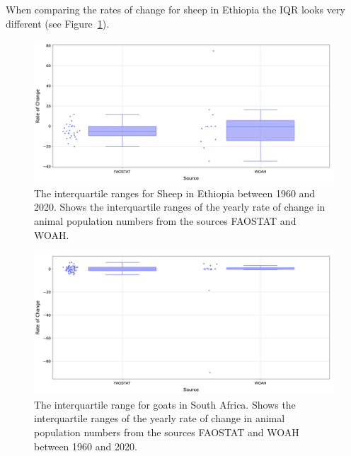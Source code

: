 \documentclass{article}
\begin{document}
When comparing the rates of change for sheep in Ethiopia the IQR looks very different (see Figure~\ref{fig:image7}).
\begin{figure}[h!]
    \centering
    \includegraphics[width=1\textwidth]{image7}
    \caption{The interquartile ranges for Sheep in Ethiopia between 1960 and 2020. Shows the interquartile ranges of the yearly rate of change in animal population numbers from the sources FAOSTAT and WOAH.}
    \label{fig:image7}
\end{figure}
\begin{figure}[h!]
    \centering
    \includegraphics[width=1\textwidth]{image8}
    \caption{The interquartile range for goats in South Africa. Shows the interquartile ranges of the yearly rate of change in animal population numbers from the sources FAOSTAT and WOAH between 1960 and 2020.}
    \label{fig:image8}
\end{figure}
\end{document}

